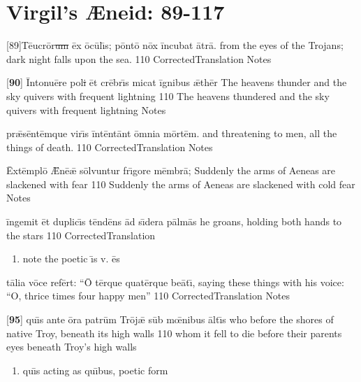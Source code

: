 \section{Virgil's {\AE}neid:  89-117} %

\latline
  {[89]T\={eu}cr\={\macron o}r\sout{um }\=ex \=oc\=ul\={\macron \i}s; p\=ont\={\macron o} n\=ox \=inc\-ub\-at \={\macron a}tr\=a.}
  { from the eyes of the Trojans; dark night falls upon the sea. }
  {110}
  { CorrectedTranslation }
  { Notes }


\latline
  {[\textbf{90}] \=Int\-on\-u\={\macron e}r\-e p\-ol\sout{i }\=et cr\={\macron e}br\={\macron \i}s m\-ic\-at \=ign\-ib\-us \={\ae}th\={\macron e}r}
  { The heavens thunder and the sky quivers with frequent lightning }
  {110}
  {  The heavens thundered and the sky quivers with frequent lightning }
  { Notes }


\latline
  {pr\={\ae}s\=ent\=emqu\-e v\-ir\={\macron \i}s \=int\=ent\=ant \=omn\-i\-a m\=ort\=em.}
  { and threatening to men, all the things of death. }
  {110}
  { CorrectedTranslation }
  { Notes }




\latline
  {\=Ext\=empl\={\macron o} \={\AE}n\={\macron e}\={\ae} s\=olv\-unt\-ur fr\={\macron \i}g\-or\-e m\=embr\=a;}
  { Suddenly the arms of Aeneas are slackened with fear }
  {110}
  { Suddenly the arms of Aeneas are slackened with cold fear }
  { Notes }


\latline
  {\=ing\-em\-it \=et d\-upl\-ic\={\macron \i}s t\=end\={\macron e}ns \=ad s\={\macron \i}d\-er\-a p\=alm\={\macron a}s}
  { he groans, holding both hands to the stars }
  {110}
  { CorrectedTranslation }
  { \begin{enumerate}
  	\item note the poetic \={\i}s v. \={e}s
  \end{enumerate} }


\latline
  {t\={\macron a}l\-i\-a v\={\macron o}c\-e r\-ef\=ert:  ``\={\macron O} t\=erqu\-e \-quat\=erqu\-e b\-e\={\macron a}t\={\macron \i},}
  { saying these things with his voice:  ``O, thrice times four happy men'' }
  {110}
  { CorrectedTranslation }
  { Notes }




\latline
  {[\textbf{95}] qu\={\macron \i}s \-ant\-e \={\macron o}r\-a p\-atr\=um Tr\=oj\={\ae} s\=ub m\={\oe}n\-ib\-us \=alt\={\macron \i}s}
  { who before the shores of native Troy, beneath its high walls }
  {110}
  { whom it fell to die before their parents eyes beneath Troy's high walls }
  { \begin{enumerate}
  	\item qu\={\i}s acting as qu\={\i}bus, poetic form
  \end{enumerate} }


